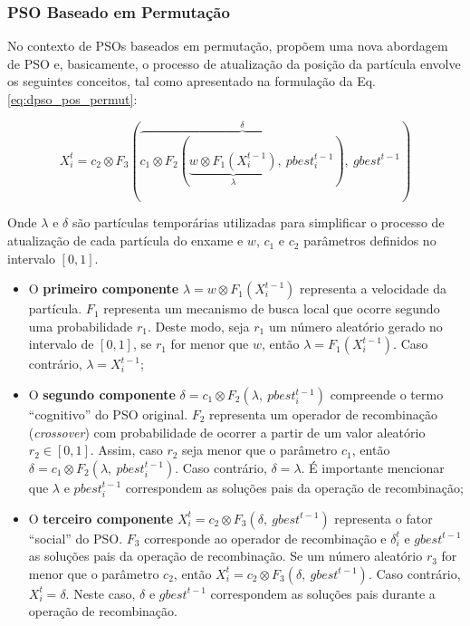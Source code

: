 \documentclass[
	12pt,				%
	openany,			%
	oneside,	
	a4paper,			%
	brazil,				%
	]{unimontes-ppgmsc-abntex2}
\begin{document}
\subsubsection{PSO Baseado em Permutação}
\label{sec:atual_part}

No contexto de PSOs baseados em permutação,  propõem uma nova abordagem de PSO e, basicamente, o processo de atualização da posição da partícula envolve os seguintes conceitos, tal como apresentado na formulação da Eq. \ref{eq:dpso_pos_permut}: 

\begin{equation}
\label{eq:dpso_pos_permut}
X^{t}_{i} = c_2 \otimes F_3 (\overbrace{c_1 \otimes F_2 (\underbrace{w \otimes F_1 (X^{t-1}_{i})}_{\lambda},\ pbest^{t-1}_{i})}^{\delta},\ 
gbest^{t-1})
\end{equation}

Onde $\lambda$ e $\delta$ são partículas temporárias utilizadas para simplificar o processo de atualização de cada partícula do enxame e $w$, $c_1$ e $c_2$ parâmetros definidos no intervalo $[0,1]$.

\begin{itemize}
\item O \textbf{primeiro componente} $\lambda = w \otimes F_1(X^{t-1}_{i})$ representa a velocidade da partícula. $F_1$ representa um mecanismo de busca local que ocorre segundo uma probabilidade $r_1$. Deste modo, seja $r_1$ um número aleatório gerado no intervalo de $[0,1]$, se $r_1$ for menor que $w$, então $\lambda  = F_1(X^{t-1}_{i})$. Caso contrário, $\lambda = X^{t-1}_{i}$; 

\item O \textbf{segundo componente} $\delta = c_1 \otimes  F_2(\lambda,\ pbest^{t-1}_{i})$ compreende o termo ``cognitivo'' do PSO original. $F_2$ representa um operador de recombinação ({\em crossover}) com probabilidade de ocorrer a partir de um valor aleatório $r_2 \in [0,1]$. Assim, caso $r_2$ seja menor que o parâmetro $c_1$, então $\delta = c_1 \otimes  F_2(\lambda,\ pbest^{t-1}_{i})$. Caso contrário, $\delta = \lambda$. É importante mencionar que $\lambda$ e $pbest^{t-1}_{i}$ correspondem as soluções pais da operação de recombinação; 

\item O \textbf{terceiro componente} $X^{t}_{i} = c_2 \otimes F_3 (\delta,\ gbest ^{t-1})$ representa o fator ``social'' do PSO. $F_3$ corresponde ao operador de recombinação e $\delta ^{t}_{i}$ e $gbest^{t-1}$ as soluções pais da operação de recombinação. Se um número aleatório $r_3$ for menor que o parâmetro $c_2$, então $X^{t}_{i} = c_2 \otimes F_3 (\delta,\ gbest ^{t-1})$. Caso contrário, $X^{t}_{i} = \delta$. Neste caso, $\delta$ e $gbest ^{t-1}$ correspondem as soluções pais durante a operação de recombinação.

\end{itemize}
\end{document}
